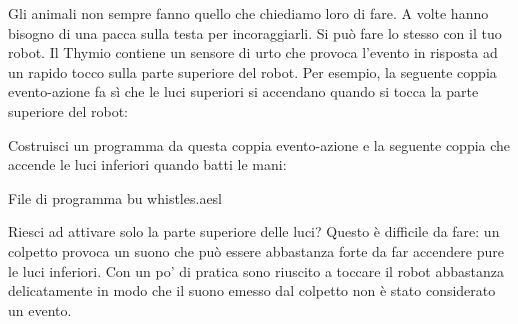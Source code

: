 



Gli animali non sempre fanno quello che chiediamo loro di fare. A volte hanno bisogno di una pacca
sulla testa per incoraggiarli. Si può fare lo stesso con il tuo robot. Il
Thymio contiene un sensore di urto che provoca l'evento  in risposta ad un rapido tocco sulla parte superiore del robot. Per esempio,
la seguente coppia evento-azione fa sì che le luci superiori si accendano quando
si tocca la parte superiore del robot: 

Costruisci un programma da questa coppia evento-azione e la seguente coppia
che accende le luci inferiori quando batti le mani: 

{\raggedleft \hfill File di programma {bu whistles.aesl}}

Riesci ad attivare solo la parte superiore delle luci? Questo è difficile da fare: un colpetto
provoca un suono che può essere abbastanza forte da far accendere pure le luci inferiori. Con un po' di pratica sono riuscito a toccare il robot
abbastanza delicatamente in modo che il suono emesso dal colpetto non è stato considerato un evento.


